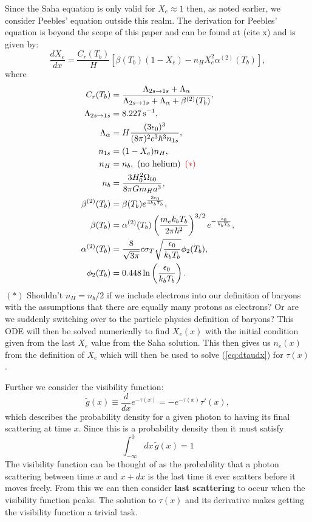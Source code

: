 \documentclass[%
reprint,
 amsmath,amssymb,
 aps,
]{revtex4-2}
\begin{document}
Since the Saha equation is only valid for $X_e\approx1$ then, as noted earlier, we consider Peebles' equation outside this realm. The derivation for Peebles' equation is beyond the scope of this paper and can be found at (cite x) and is given by:
\begin{equation}
	\frac{dX_e}{dx}=\frac{C_r(T_b)}{H}\left[\beta(T_b)(1-X_e)-n_HX_e^2\alpha^{(2)}(T_b)\right],\label{eq:Peebles}
\end{equation}
where
\begin{align*}
	C_r(T_b)&= \frac{\Lambda_{2s\rightarrow1s} +\Lambda_{\alpha}}{\Lambda_{2s\rightarrow1s} + \Lambda_{\alpha} +\beta^{(2)}(T_b)}, \\
	\Lambda_{2s\rightarrow1s}&= 8.227\,\text{s}^{-1},\\
	\Lambda_{\alpha}&= H\frac{(3\epsilon_0)^3}{(8\pi)^2 c^3\hbar^3 n_{1s}}, \\
	n_{1s}&= (1-X_e)n_H,\\
	n_H &= n_b, \,\,\text{(no helium)}\,\,\,\color{red}(*)\color{black}\\
	n_b &= \frac{3H_0^2 \Omega_{b0}}{8\pi G m_H a^3},\\
	\beta^{(2)}(T_b) &= \beta(T_b) e^{\frac{3\epsilon_0}{4k_bT_b}},\\
	\beta(T_b) &= \alpha^{(2)}(T_b) \left(\frac{m_ek_bT_b}{2\pi \hbar^2}\right)^{3/2} e^{-\frac{\epsilon_0}{k_bT_b}},\\
	\alpha^{(2)}(T_b)&= \frac{8}{\sqrt{3\pi}}	c\sigma_T\sqrt{\frac{\epsilon_0}{k_bT_b}}\phi_2(T_b),\\
	\phi_2(T_b)&= 0.448\ln\left(\frac{\epsilon_0}{k_bT_b}\right).
\end{align*}
\color{red}$(*)$ Shouldn't $n_H=n_b/2$ if we include electrons into our definition of baryons with the assumptions that there are equally many protons as electrons? Or are we suddenly switching over to the particle physics definition of baryons? \color{black}This ODE will then be solved numerically to find $X_e(x)$ with the initial condition given from the last $X_e$ value from the Saha solution. This then gives us $n_e(x)$ from the definition of $X_e$ which will then be used to solve (\ref{eq:dtaudx}) for $\tau(x)$.

Further we consider the visibility function:
\begin{equation}
	\tilde g(x)\equiv\frac{d}{dx}e^{-\tau(x)}=-e^{-\tau(x)}\tau'(x), \label{gtilde}
\end{equation}
which describes the probability density for a given photon to having its final scattering at time $x$. Since this is a probability density then it must satisfy
\[\int_{-\infty}^0dx\,\tilde g(x)=1\]
The visibility function can be thought of as the probability that a photon scattering between time $x$ and $x+dx$ is the last time it ever scatters before it moves freely. From this we can then consider \textbf{last scattering} to occur when the visibility function peaks. The solution to $\tau(x)$ and its derivative makes getting the visibility function a trivial task.
\end{document}
